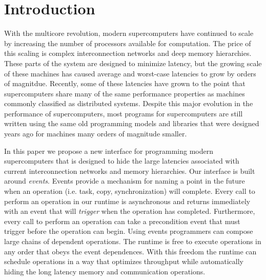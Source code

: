 
\section{Introduction}
\label{sec:intro}



With the multicore revolution, modern supercomputers have continued to scale
by increasing the number of processors available for computation.  The
price of this scaling is complex interconnection networks and
deep memory hierarchies.  These parts of the system are designed to
minimize latency, but the growing scale of these machines has
caused average and worst-case latencies to grow by orders of magnitdue.
Recently, some of these latencies have grown to the point that supercomputers
share many of the same performance properties as machines commonly
classified as distributed systems.  Despite this major evolution in the
performance of supercomputers, most programs for supercomputers are still
written using the same old programming models and libraries that were designed
years ago for machines many orders of magnitude smaller.  
  
In this paper we propose a new interface for programming modern supercomputers 
that is designed to hide the large latencies associated with current 
interconnection networks and memory hierarchies.  Our interface is built 
around {\em events}.  Events provide a mechanism for naming a point in the future
when an operation (i.e. task, copy, synchronization) will complete.  Every call to perform
an operation in our runtime is asynchronous and returns immediately with an event that will 
{\em trigger} when the operation has completed.  Furthermore, every call
to perform an operation can take a precondition event that must trigger before
the operation can begin.  Using events programmers can compose large
chains of dependent operations.  The runtime is free to execute operations
in any order that obeys the event dependences.  With this freedom the
runtime can schedule operations in a way that optimizes throughput
while automatically hiding the long latency memory and communication operations.

